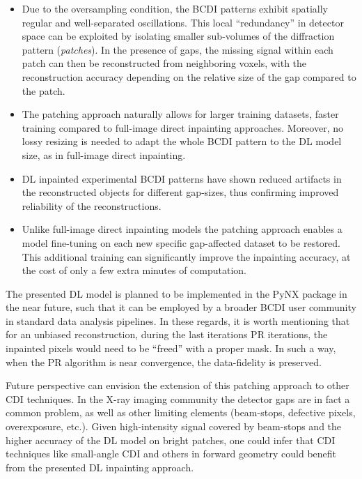 \begin{itemize}
    \item Due to the oversampling condition, the BCDI patterns exhibit spatially regular and well-separated oscillations. 
    This local ``redundancy'' in detector space can be exploited by isolating smaller sub-volumes of the diffraction 
    pattern (\textit{patches}). In the presence of gaps, the missing signal within each patch can then be reconstructed 
    from neighboring voxels, with the reconstruction accuracy depending on the relative size of the gap compared to 
    the patch.

    \item The patching approach naturally allows for larger training datasets, faster training compared to full-image 
    direct inpainting approaches. Moreover, no lossy resizing is needed to adapt the whole BCDI pattern to the DL model size, as 
    in full-image direct inpainting. 

    \item DL inpainted experimental BCDI patterns have shown reduced artifacts in the reconstructed objects for different 
    gap-sizes, thus confirming improved reliability of the reconstructions. 

    \item Unlike full-image direct inpainting models the patching approach enables a model fine-tuning on each new specific 
    gap-affected dataset to be restored. This additional training can significantly improve the inpainting accuracy, 
    at the cost of only a few extra minutes of computation. 
        
\end{itemize}

The presented DL model is planned to be implemented in the PyNX package in the near future, such that it can be employed by 
a broader BCDI user community in standard data analysis pipelines. In these regards, it is worth mentioning that for 
an unbiased reconstruction, during the last iterations PR iterations, the 
inpainted pixels would need to be ``freed'' with a proper mask. In such a way, when the PR algorithm is near 
convergence, the data-fidelity is preserved. 

Future perspective can envision the extension of this patching approach to other CDI techniques. In the X-ray imaging 
community the detector gaps are in fact a common problem, as well as other limiting elements (beam-stops, defective pixels, 
overexposure, etc.). Given high-intensity signal covered by beam-stops and the higher accuracy of the DL model on 
bright patches, one could infer that CDI techniques like small-angle CDI and others in forward geometry could benefit 
from the presented DL inpainting approach.

